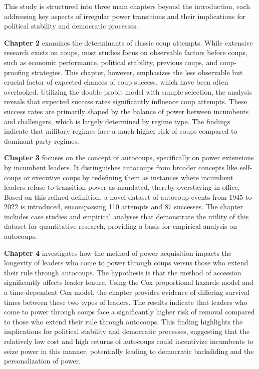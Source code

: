 \documentclass[
  12pt,
]{report}
\begin{document}
This study is structured into three main chapters beyond the
introduction, each addressing key aspects of irregular power transitions
and their implications for political stability and democratic processes.

\textbf{Chapter 2} examines the determinants of classic coup attempts.
While extensive research exists on coups, most studies focus on
observable factors before coups, such as economic performance, political
stability, previous coups, and coup-proofing strategies. This chapter,
however, emphasizes the less observable but crucial factor of expected
chances of coup success, which have been often overlooked. Utilizing the
double probit model with sample selection, the analysis reveals that
expected success rates significantly influence coup attempts. These
success rates are primarily shaped by the balance of power between
incumbents and challengers, which is largely determined by regime type.
The findings indicate that military regimes face a much higher risk of
coups compared to dominant-party regimes.

\textbf{Chapter 3} focuses on the concept of autocoups, specifically on
power extensions by incumbent leaders. It distinguishes autocoups from
broader concepts like self-coups or executive coups by redefining them
as instances where incumbent leaders refuse to transition power as
mandated, thereby overstaying in office. Based on this refined
definition, a novel dataset of autocoup events from 1945 to 2022 is
introduced, encompassing 110 attempts and 87 successes. The chapter
includes case studies and empirical analyses that demonstrate the
utility of this dataset for quantitative research, providing a basis for
empirical analysis on autocoups.

\textbf{Chapter 4} investigates how the method of power acquisition
impacts the longevity of leaders who come to power through coups versus
those who extend their rule through autocoups. The hypothesis is that
the method of accession significantly affects leader tenure. Using the
Cox proportional hazards model and a time-dependent Cox model, the
chapter provides evidence of differing survival times between these two
types of leaders. The results indicate that leaders who come to power
through coups face a significantly higher risk of removal compared to
those who extend their rule through autocoups. This finding highlights
the implications for political stability and democratic processes,
suggesting that the relatively low cost and high returns of autocoups
could incentivize incumbents to seize power in this manner, potentially
leading to democratic backsliding and the personalization of power.
\end{document}
